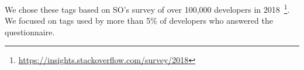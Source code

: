 \documentclass[english,preprint,JIP,technote]{ipsj}
\begin{document}
We chose these tags based on SO's survey of over 100,000 developers in 2018~\footnote{\url{https://insights.stackoverflow.com/survey/2018}}. We focused on tags used by more than 5\% of developers who answered the questionnaire. 



\end{document}
